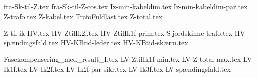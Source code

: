 \usepackage[utf8]{inputenc}%
\usepackage{amsmath}%
\usepackage{mathtools}%
\usepackage{icomma}%
\usepackage{siunitx}%
\usepackage{fp}%
\usepackage{xstring}%
\usepackage{listofitems}
\usepackage{ifthen}
\usepackage{gensymb} %

{fra-Sk-til-Z.tex}
{fra-Sk-til-Z-cos.tex}
{Iz-min-kabeldim.tex}
{Iz-min-kabeldim-par.tex}
{Z-trafo.tex}
{Z-kabel.tex}
{TrafoFuldlast.tex}
{Z-total.tex}

{Z-til-ik-HV.tex}
{HV-ZtilIk2f.tex}
{HV-ZtilIk1f-prim.tex}
{S-jordskinne-trafo.tex}
{HV-spændingsfald.tex}
{HV-KBtid-leder.tex}
{HV-KBtid-skærm.tex}

{Fasekompensering_med_result_I.tex}
{LV-ZtilIk1f-min.tex}
{LV-Z-total-max.tex}
{LV-Ik1f.tex}
{LV-Ik2f.tex}
{LV-Ik2f-par-sikr.tex}
{LV-Ik3f.tex}
{LV-spændingsfald.tex}